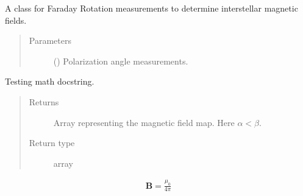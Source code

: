 \documentclass[letterpaper,10pt,english]{sphinxmanual}
\begin{document}

\begin{fulllineitems}
\label{\detokenize{usage/installation:astroph.random_code.FaradayRotation}}
A class for Faraday Rotation measurements to determine
interstellar magnetic fields.
\begin{quote}\begin{description}
\item[{Parameters}] \leavevmode
{} () \textendash{} Polarization angle measurements.

\end{description}\end{quote}

\end{fulllineitems}


\begin{fulllineitems}
\label{\detokenize{usage/installation:astroph.random_code.FaradayRotation._get_magnetic_field_map}}
Testing math docstring.
\begin{quote}\begin{description}
\item[{Returns}] \leavevmode
{} \textendash{} Array representing the magnetic field map. Here
\(\alpha < \beta\).

\item[{Return type}] \leavevmode
array

\end{description}\end{quote}
\begin{equation*}
\begin{split}\mathbf{B} = \frac{\mu_0}{4\pi}\end{split}
\end{equation*}
\begin{sphinxVerbatim}[commandchars=\\\{\}]
 
\end{sphinxVerbatim}

\end{fulllineitems}
\end{document}
